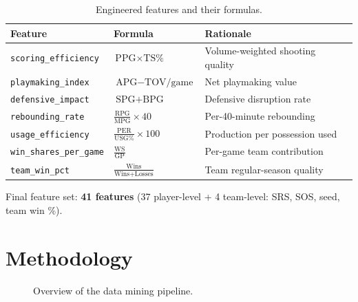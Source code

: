 \documentclass[12pt, a4paper]{article}
\begin{document}
\begin{table}[H]
\centering
\caption{Engineered features and their formulas.}
\label{tab:features}
\begin{tabular}{@{}lll@{}}
\toprule
\textbf{Feature} & \textbf{Formula} & \textbf{Rationale} \\
\midrule
\texttt{scoring\_efficiency} & $\text{PPG} \times \text{TS\%}$ & Volume-weighted shooting quality \\
\texttt{playmaking\_index} & $\text{APG} - \text{TOV/game}$ & Net playmaking value \\
\texttt{defensive\_impact} & $\text{SPG} + \text{BPG}$ & Defensive disruption rate \\
\texttt{rebounding\_rate} & $\frac{\text{RPG}}{\text{MPG}} \times 40$ & Per-40-minute rebounding \\
\texttt{usage\_efficiency} & $\frac{\text{PER}}{\text{USG\%}} \times 100$ & Production per possession used \\
\texttt{win\_shares\_per\_game} & $\frac{\text{WS}}{\text{GP}}$ & Per-game team contribution \\
\texttt{team\_win\_pct} & $\frac{\text{Wins}}{\text{Wins} + \text{Losses}}$ & Team regular-season quality \\
\bottomrule
\end{tabular}
\end{table}

Final feature set: \textbf{41 features} (37 player-level + 4 team-level: SRS, SOS, seed, team win \%).

\section{Methodology}
\label{sec:methods}

\begin{figure}[H]
\centering
{}
\caption{Overview of the data mining pipeline.}
\label{fig:pipeline}
\end{figure}
\end{document}
